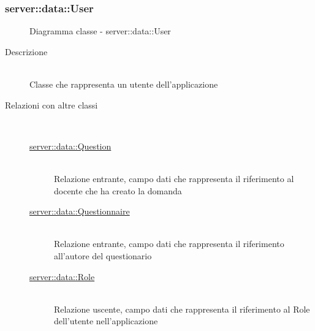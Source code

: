 \subsubsection[User]{server::data::User}
\begin{figure}[H]
	\centering
	\caption{Diagramma classe - server::data::User}
\end{figure}\begin{description}
\item[Descrizione] \hfill \\
Classe che rappresenta un utente dell'applicazione
\item[Relazioni con altre classi] \hfill \\
\vspace{-7mm}
\begin{description}
	\item[\hyperlink{server::data::Question}{server::data::Question}] \hfill \\
	Relazione entrante, campo dati che rappresenta il riferimento al docente che ha creato la domanda
	\item[\hyperlink{server::data::Questionnaire}{server::data::Questionnaire}] \hfill \\
	Relazione entrante, campo dati che rappresenta il riferimento all'autore del questionario
	\item[\hyperlink{server::data::Role}{server::data::Role}] \hfill \\
	Relazione uscente, campo dati che rappresenta il riferimento al Role dell'utente nell'applicazione
\end{description}


\end{description}
